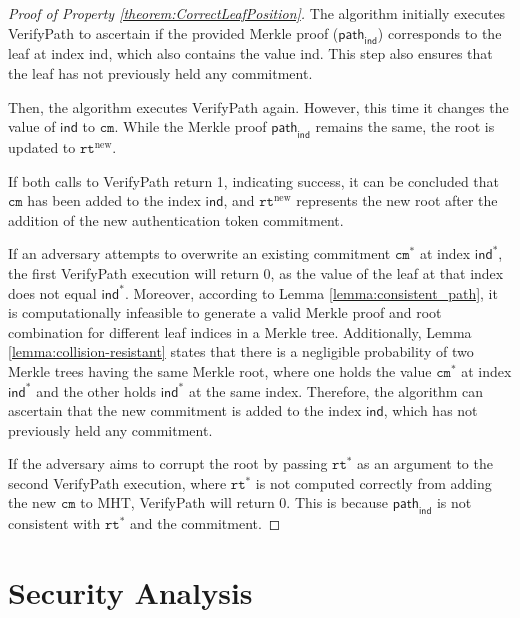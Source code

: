 \begin{proof} [Proof of Property \ref{theorem:CorrectLeafPosition}]
	The algorithm initially executes \textsf{VerifyPath} to ascertain if the provided Merkle proof ($\textsf{path}_\mathsf{ind}$) corresponds to  the leaf at index \textsf{ind}, which also contains the value \textsf{ind}. This step also ensures that the leaf has not previously held any commitment.
 
    Then, the algorithm executes \textsf{VerifyPath} again. However, this time it changes the value of $\textsf{ind}$ to $\texttt{cm}$. While the Merkle proof $\textsf{path}_\mathsf{ind}$ remains the same, the root is updated to $\texttt{rt}^\text{new}$. 
    
    If both calls to \textsf{VerifyPath} return 1, indicating success, it can be concluded that $\texttt{cm}$ has been added to the index $\textsf{ind}$, and $\texttt{rt}^\text{new}$ represents the new root after the addition of the new authentication token commitment.

    If an adversary attempts to overwrite an existing commitment $\texttt{cm}^*$ at index $\textsf{ind}^*$, the first \textsf{VerifyPath} execution will return 0, as the value of the leaf at that index does not equal $\textsf{ind}^*$. Moreover, according to Lemma \ref{lemma:consistent_path}, it is computationally infeasible to generate a valid Merkle proof and root combination for different leaf indices in a Merkle tree. Additionally, Lemma \ref{lemma:collision-resistant} states that there is a negligible probability of two Merkle trees having the same Merkle root, where one holds the value $\texttt{cm}^*$ at index $\textsf{ind}^*$ and the other holds $\textsf{ind}^*$ at the same index. Therefore, the algorithm can ascertain that the new commitment is added to the index $\textsf{ind}$, which has not previously held any commitment.
    
    If the adversary aims to corrupt the root by passing $\texttt{rt}^{*}$ as an argument to the second \textsf{VerifyPath} execution, where $\texttt{rt}^{*}$ is not computed correctly from adding the new $\texttt{cm}$ to \textsf{MHT}, \textsf{VerifyPath} will return 0. This is because $\textsf{path}_\mathsf{ind}$ is not consistent with $\texttt{rt}^{*}$ and the commitment.
\end{proof}

\section{Security Analysis}

